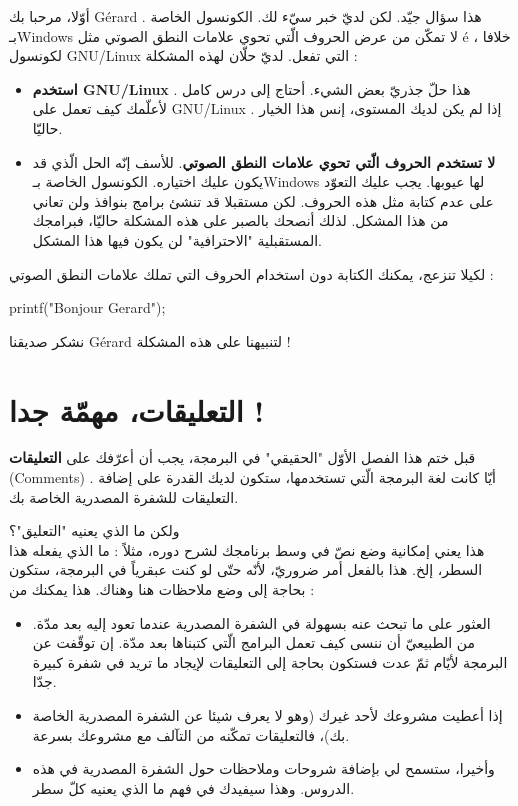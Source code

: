أوّلا، مرحبا بك
\textenglish{Gérard}
. هذا سؤال جيّد. لكن لديّ خبر سيّء لك. الكونسول الخاصة بـ\textenglish{Windows}
لا تمكّن من عرض الحروف الّتي تحوي علامات النطق الصوتي مثل
\textenglish{é}
، خلافا لكونسول
\textenglish{GNU/Linux}
التي تفعل. لديّ حلّان لهذه المشكلة :

\begin{itemize}
  \item \textbf{استخدم
\textenglish{GNU/Linux}}
. هذا حلّ جذريّ بعض الشيء. أحتاج إلى درس كامل لأعلّمك كيف تعمل على
\textenglish{GNU/Linux}
. إذا لم يكن لديك المستوى، إنس هذا الخيار حاليّا.
  \item \textbf{لا تستخدم الحروف الّتي تحوي علامات النطق الصوتي}.
للأسف إنّه الحل الّذي قد يكون عليك اختياره. الكونسول الخاصة بـ\textenglish{Windows}
لها عيوبها. يجب عليك التعوّد على عدم كتابة مثل هذه الحروف. لكن مستقبلا قد تنشئ برامج بنوافذ ولن تعاني من هذا المشكل. لذلك أنصحك بالصبر على هذه المشكلة حاليّا، فبرامجك المستقبلية "الاحترافية" لن يكون فيها هذا المشكل.
\end{itemize}

لكيلا تنزعج، يمكنك الكتابة دون استخدام الحروف التي تملك علامات النطق الصوتي :

\begin{Csource}
printf("Bonjour Gerard\n");
\end{Csource}

نشكر صديقنا
\textenglish{Gérard}
لتنبيهنا على هذه المشكلة !

\section{التعليقات، مهمّة جدا !}

قبل ختم هذا الفصل الأوّل "الحقيقي" في البرمجة، يجب أن أعرّفك على
\textbf{التعليقات}
(\textenglish{Comments})
. أيّا كانت لغة البرمجة الّتي تستخدمها، ستكون لديك القدرة على إضافة التعليقات للشفرة المصدرية الخاصة بك.

ولكن ما الذي يعنيه "التعليق"؟\\
هذا يعني إمكانية وضع نصّ في وسط برنامجك لشرح دوره، مثلاً : ما الذي يفعله هذا السطر، إلخ. هذا بالفعل أمر ضروريّ، لأنّه حتّى لو كنت عبقرياً في البرمجة، ستكون بحاجة إلى وضع ملاحظات هنا وهناك. هذا يمكنك من :

\begin{itemize}
  \item العثور على ما تبحث عنه بسهولة في الشفرة المصدرية عندما تعود إليه بعد مدّة. من الطبيعيّ أن ننسى كيف تعمل البرامج الّتي كتبناها بعد مدّة. إن توقّفت عن البرمجة لأيّام ثمّ عدت فستكون بحاجة إلى التعليقات لإيجاد ما تريد في شفرة كبيرة جدّا.
  \item إذا أعطيت مشروعك لأحد غيرك (وهو لا يعرف شيئا عن الشفرة المصدرية الخاصة بك)، فالتعليقات تمكّنه من التآلف مع مشروعك بسرعة.
  \item وأخيرا، ستسمح لي بإضافة شروحات وملاحظات حول الشفرة المصدرية في هذه الدروس. وهذا سيفيدك في فهم ما الذي يعنيه كلّ سطر.
\end{itemize}

